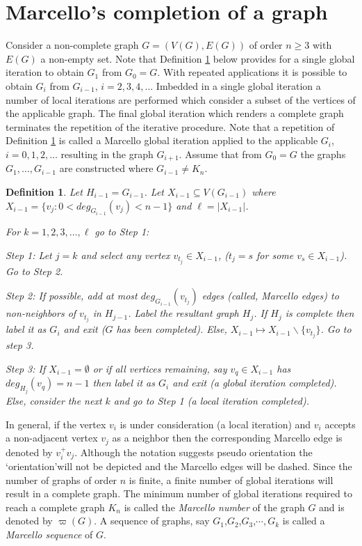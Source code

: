 \documentclass[12pt]{amsart}
\numberwithin{equation}{section}
\newtheorem{definition}{Definition}[section]
\numberwithin{equation}{section}
\begin{document}
\section{Marcello's completion of a graph}
Consider a non-complete graph $G = (V(G), E(G))$ of order $n \geq 3$ with $E(G)$ a non-empty set. Note that Definition \ref{def1} below provides for a single global iteration to obtain $G_1$ from $G_0 = G$. With repeated applications it is possible to obtain $G_i$ from $G_{i-1}$, $i = 2,3,4,\dots$ Imbedded in a single global iteration a number of local iterations are performed which consider a subset of the vertices of the applicable graph. The final global iteration which renders a complete graph terminates the repetition of the iterative procedure. Note that a repetition of Definition \ref{def1} is called a Marcello global iteration applied to the applicable $G_i$, $i = 0,1,2,\dots$ resulting in the graph $G_{i+1}$. Assume that from $G_0 = G$ the graphs $G_1,\dots,G_{i-1}$ are constructed where $G_{i-1} \neq K_n$.
\begin{definition}\label{def1}
Let $H_{i-1} = G_{i-1}$. Let $X_{i-1} \subseteq V(G_{i-1})$ where $X_{i-1} = \{v_j: 0 < deg_{G_{i-1}}(v_j) < n-1\}$ and $\ell = |X_{i-1}|$. 
 
For $k = 1,2,3,\dots, \ell$ go to Step 1: 

Step 1:  Let $j = k$ and select any vertex $v_{t_j} \in X_{i-1}$, ($t_j = s$ for some $v_s \in X_{i-1}$). Go to Step 2.

Step 2: If possible, add at most $deg_{G_{i-1}}(v_{t_j})$ edges (called, Marcello edges) to non-neighbors of $v_{t_j}$ in $H_{j-1}$. Label the resultant graph $H_j$. If $H_j$ is complete then label it as $G_i$ and exit ($G$ has been completed). Else, $X_{i-1}\mapsto X_{i-1}\backslash \{v_{t_j}\}$. Go to step 3.

Step 3: If $X_{i-1} = \emptyset$ or if all vertices remaining, say $v_q \in X_{i-1}$ has $deg_{H_j}(v_q) = n-1$ then label it as $G_i$ and exit (a global iteration completed). Else, consider the next $k$ and go to Step 1 (a local iteration completed).\\
\end{definition}
In general, if the vertex $v_i$ is under consideration (a local iteration) and $v_i$ accepts a non-adjacent vertex $v_j$ as a neighbor then the corresponding Marcello edge is denoted by $v^+_iv_j$. Although the notation suggests pseudo orientation the \lq orientation\rq  will not be depicted and the Marcello edges will be dashed. Since the number of graphs of order $n$ is finite, a finite number of global iterations will result in a complete graph. The minimum number of global iterations required to reach a complete graph $K_n$ is called the \emph{Marcello number} of the graph $G$ and is denoted by $\varpi(G)$. A sequence of graphs, say $G_1$,$G_2$,$G_3$,$\cdots, G_k$ is called a \emph{Marcello sequence} of $G$.
\end{document}
